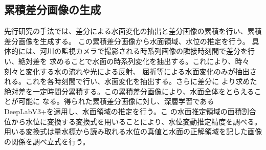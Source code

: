 \documentclass[10pt,a4j,twocolumn,oneside]{jsarticle}
\begin{document}
\subsection{累積差分画像の生成}
先行研究の手法では、差分による水面変化の抽出と差分画像の累積を行い、累積差分画像を生成する。
この累積差分画像から水面領域、水位の推定を行う。
具体的には、河川の監視カメラで撮影される時系列画像の隣接時刻間で差分を行い、絶対差を
求めることで水面の時系列変化を抽出する。これにより、時々刻々と変化する水の流れや光による反射、
屈折等による水面変化のみが抽出される。これを各時刻間で行い、水面変化を抽出する。さらに差分に
より求めた絶対差を一定時間分累積する。この累積差分画像により、水面全体をとらえることが可能に
なる。得られた累積差分画像に対し、深層学習であるDeepLabV3+を適用し、水面領域の推定を行う。こ
の水面推定領域の面積割合位から水位に変換する変換式を用いることにより、水位変動推定精度を調べる。
用いる変換式は量水標から読み取れる水位の真値と水面の正解領域を記した画像の関係を調べ立式を行う。


\end{document}

